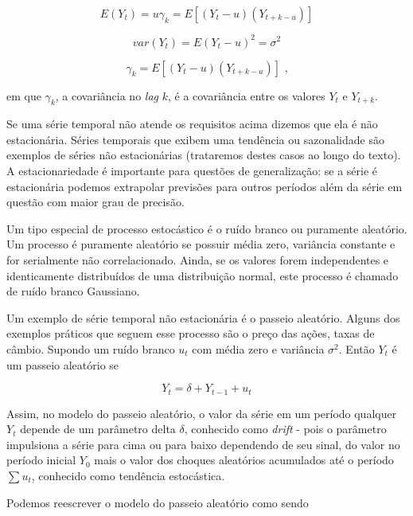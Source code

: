 \documentclass[twocolumn]{rbef}
\newcommand{\1}{\mathbbm{1}}
\begin{document}
\begin{equation}
E(Y_{t}) = u 
\gamma_{k} = E[(Y_{t} - u) (Y_{t+k - u})]
\end{equation}

\begin{equation}
var(Y_t) = E(Y_{t} - u)^2 = \sigma^{2} 
\end{equation}

\begin{equation}
\gamma_{k} = E[(Y_{t} - u) (Y_{t+k - u})] \text{ ,}
\end{equation}

em que $\gamma_{k}$, a covariância no \textit{lag} $k$, é a covariância entre os valores $Y_{t}$ e $Y_{t+k}$.

Se uma série temporal não atende os requisitos acima dizemos que ela é não estacionária. Séries temporais que exibem uma tendência ou sazonalidade são exemplos de séries não estacionárias (trataremos destes casos ao longo do texto). A estacionariedade é importante para questões de generalização: se a série é estacionária podemos extrapolar previsões para outros períodos além da série em questão com maior grau de precisão.

Um tipo especial de processo estocástico é o ruído branco ou puramente aleatório. Um processo é puramente aleatório se possuir média zero, variância constante e for serialmente não correlacionado. Ainda, se os valores forem independentes e identicamente distribuídos de uma distribuição normal, este processo é chamado de ruído branco Gaussiano.

Um exemplo de série temporal não estacionária é o passeio aleatório. Alguns dos exemplos práticos que seguem esse processo são o preço das ações, taxas de câmbio. Supondo um ruído branco $u_{t}$ com média zero e variância $\sigma^{2}$. Então $Y_{t}$ é um passeio aleatório se

\begin{equation}
Y_{t} = \delta + Y_{t-1} + u_{t}
\end{equation}

Assim, no modelo do passeio aleatório, o valor da série em um período qualquer $Y_{t}$ depende de um parâmetro delta $\delta$, conhecido como \textit{drift} - pois o parâmetro impulsiona a série para cima ou para baixo dependendo de seu sinal, do valor no período inicial $Y_{0}$ mais o valor dos choques aleatórios acumulados até o período $\sum u_{t}$, conhecido como tendência estocástica.

Podemos reescrever o modelo do passeio aleatório como sendo
\end{document}
